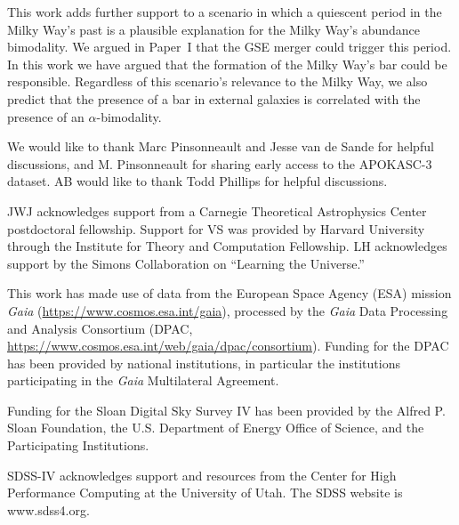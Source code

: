 \documentclass[twocolumn,linenumbers]{aastex631}
\begin{document}
This work adds further support to a scenario in which a quiescent period in the Milky Way's past is a plausible explanation for the Milky Way's abundance bimodality. We argued in Paper~I that the GSE merger could trigger this period. In this work we have argued that the formation of the Milky Way's bar could be responsible. Regardless of this scenario's relevance to the Milky Way, we also predict that the presence of a bar in external galaxies is correlated with the presence of an $\alpha$-bimodality.

\begin{acknowledgements}
  We would like to thank Marc Pinsonneault and Jesse van de Sande for helpful discussions, and M. Pinsonneault for sharing early access to the APOKASC-3 dataset. AB would like to thank Todd Phillips for helpful discussions.

  JWJ acknowledges support from a Carnegie Theoretical Astrophysics Center postdoctoral fellowship. Support for VS was provided by Harvard University through the Institute for Theory and Computation Fellowship. LH acknowledges support by the Simons Collaboration on ``Learning the Universe.''

  This work has made use of data from the European Space Agency (ESA) mission {\it Gaia} (\url{https://www.cosmos.esa.int/gaia}), processed by the {\it Gaia} Data Processing and Analysis Consortium (DPAC, \url{https://www.cosmos.esa.int/web/gaia/dpac/consortium}). Funding for the DPAC has been provided by national institutions, in particular the institutions participating in the {\it Gaia} Multilateral Agreement.
  
  Funding for the Sloan Digital Sky 
  Survey IV has been provided by the 
  Alfred P. Sloan Foundation, the U.S. 
  Department of Energy Office of 
  Science, and the Participating 
  Institutions. 
  
  SDSS-IV acknowledges support and 
  resources from the Center for High 
  Performance Computing  at the 
  University of Utah. The SDSS 
  website is www.sdss4.org.
  

\end{acknowledgements}
\end{document}
